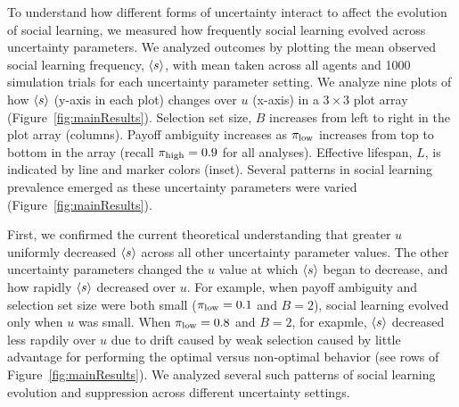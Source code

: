 \documentclass[letterpaper,11.5pt]{scrartcl}
\begin{document}
To understand how different forms of uncertainty interact to affect the evolution of
social learning, we measured how frequently social learning evolved across
uncertainty parameters. We analyzed outcomes by plotting the mean observed social
learning frequency, $\langle s \rangle$, with mean taken across all agents and 1000 simulation trials for each
uncertainty parameter setting.   
We analyze nine plots of how $\langle s \rangle$ (y-axis in each plot) changes over $u$ (x-axis) 
in a $3\times3$ plot array (Figure~\ref{fig:mainResults}). 
Selection set size, $B$ increases from left to right in the plot array (columns). 
Payoff ambiguity increases as $\pi_{\mathrm{low}}$ increases from top to bottom in the array 
(recall $\pi_{\mathrm{high}}=0.9$ for all analyses).
Effective lifespan, $L$, is indicated by line and marker colors (inset). 
Several patterns in social learning prevalence emerged as 
these uncertainty parameters were varied (Figure~\ref{fig:mainResults}). 

First, we confirmed the current theoretical understanding that greater $u$ uniformly decreased
$\langle s \rangle$ across all other uncertainty parameter values. The other uncertainty
parameters changed the $u$ value at which $\langle s \rangle$ began to decrease,
and how rapidly $\langle s \rangle$ decreased over $u$. 
For example, when payoff ambiguity and selection set size were
both small ($\pi_{\mathrm{low}} = 0.1$ and $B=2$), social learning evolved only when $u$ was
small. 
When $\pi_{\mathrm{low}} = 0.8$ and $B=2$, for exapmle, $\langle s \rangle$ decreased less rapdily over $u$ due to 
drift caused by weak selection caused by little advantage for performing the optimal versus
non-optimal behavior (see rows of Figure~\ref{fig:mainResults}). We analyzed several
such patterns of social learning evolution and suppression across different uncertainty settings.
\end{document}
